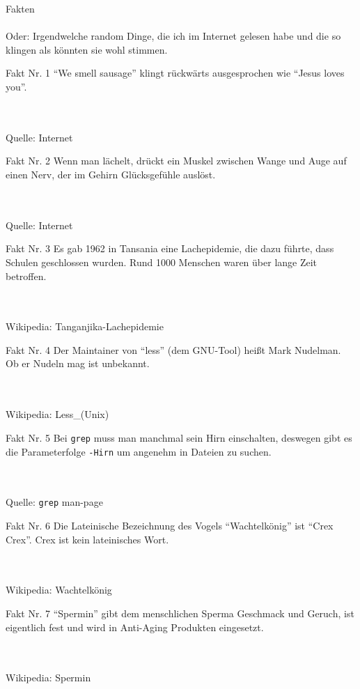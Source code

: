 \documentclass{beamer}
\newenvironment{fakt}[1]
{\begin{frame}{Fakt Nr. #1}\centering}
{\end{frame}}
\newcommand{\rating}[1]{}
\newcommand{\wiki}[1]{\\\hfill\\Wikipedia: #1}
\newcommand{\source}[1]{\\\hfill\\Quelle: #1}
\begin{document}
	\begin{frame}
		\begin{center}
			{\huge Fakten}\\
			\hfill\\\pause
			Oder: Irgendwelche random Dinge, die ich im Internet gelesen habe und die so klingen als könnten sie wohl stimmen.
		\end{center}
	\end{frame}
	
	\begin{fakt}{1}
		"`We smell sausage"' klingt rückwärts ausgesprochen wie "`Jesus loves you"'.
		\rating{4}
		\source{Internet}
	\end{fakt}

	\begin{fakt}{2}
		Wenn man lächelt, drückt ein Muskel zwischen Wange und Auge auf einen Nerv, der im Gehirn Glücksgefühle auslöst.
		\rating{3}
		\source{Internet}
	\end{fakt}

	\begin{fakt}{3}
		Es gab 1962 in Tansania eine Lachepidemie, die dazu führte, dass Schulen geschlossen wurden. Rund 1000 Menschen waren über lange Zeit betroffen.
		\rating{7}
		\wiki{Tanganjika-Lachepidemie}
	\end{fakt}
	
	\begin{fakt}{4}
		Der Maintainer von "`less"' (dem GNU-Tool) heißt Mark Nudelman. Ob er Nudeln mag ist unbekannt.
		\rating{6}
		\wiki{Less\_(Unix)}
	\end{fakt}

	\begin{fakt}{5}
		Bei \texttt{grep} muss man manchmal sein Hirn einschalten, deswegen gibt es die Parameterfolge \texttt{-Hirn} um angenehm in Dateien zu suchen.
		\rating{10}
		\source{\texttt{grep} man-page}
	\end{fakt}

	\begin{fakt}{6}
		Die Lateinische Bezeichnung des Vogels "`Wachtelkönig"' ist "`Crex Crex"'. \pause
		Crex ist kein lateinisches Wort.
		\rating{8}
		\wiki{Wachtelkönig}
	\end{fakt}

	\begin{fakt}{7}
		"`Spermin"' gibt dem menschlichen Sperma Geschmack und Geruch, ist eigentlich fest und wird in Anti-Aging Produkten eingesetzt.
		\rating{8}
		\wiki{Spermin}
	\end{fakt}
\end{document}
